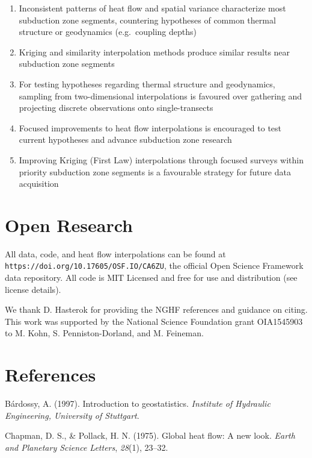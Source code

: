 \documentclass[draft,linenumbers]{agujournal2018}
\begin{document}
\begin{enumerate}
\def\labelenumi{\arabic{enumi}.}
\item
  Inconsistent patterns of heat flow and spatial variance characterize
  most subduction zone segments, countering hypotheses of common thermal
  structure or geodynamics (e.g.~coupling depths)
\item
  Kriging and similarity interpolation methods produce similar results
  near subduction zone segments
\item
  For testing hypotheses regarding thermal structure and geodynamics,
  sampling from two-dimensional interpolations is favoured over
  gathering and projecting discrete observations onto single-transects
\item
  Focused improvements to heat flow interpolations is encouraged to test
  current hypotheses and advance subduction zone research
\item
  Improving Kriging (First Law) interpolations through focused surveys
  within priority subduction zone segments is a favourable strategy for
  future data acquisition
\end{enumerate}

\section{Open Research}

All data, code, and heat flow interpolations can be found at
\texttt{https://doi.org/10.17605/OSF.IO/CA6ZU}, the official Open
Science Framework data repository. All code is MIT Licensed and free for
use and distribution (see license details).

\clearpage

\acknowledgments

We thank D. Hasterok for providing the NGHF references and guidance on
citing. This work was supported by the National Science Foundation grant
OIA1545903 to M. Kohn, S. Penniston-Dorland, and M. Feineman.

\section{References}

\hypertarget{refs_main}{}
\leavevmode{}%
Bárdossy, A. (1997). Introduction to geostatistics. \emph{Institute of
Hydraulic Engineering, University of Stuttgart}.

\leavevmode{}%
Chapman, D. S., \& Pollack, H. N. (1975). Global heat flow: A new look.
\emph{Earth and Planetary Science Letters}, \emph{28}(1), 23--32.
\end{document}
